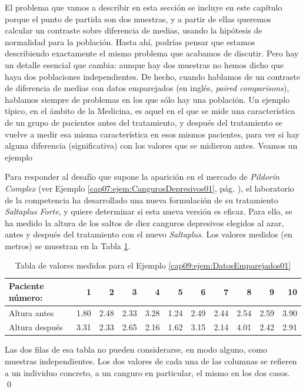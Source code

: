 El problema que vamos a describir en esta sección se incluye en este capítulo porque el punto de partida son dos muestras, y a partir de ellas queremos calcular un contraste sobre diferencia de medias, usando la hipótesis de normalidad para la población. Hasta ahí, podrías pensar que estamos describiendo exactamente el mismo problema que acabamos de discutir. Pero hay un detalle esencial que cambia: aunque hay dos muestras no hemos dicho que haya dos poblaciones independientes. De hecho, cuando hablamos de un contraste de diferencia de medias con {\sf datos emparejados} (en inglés, {\em paired comparisons}), hablamos siempre de problemas en los que sólo hay una población. Un ejemplo típico, en el ámbito de la Medicina, es aquel en el que se mide una característica de un grupo de pacientes antes del tratamiento, y después del tratamiento se vuelve a medir esa misma característica en esos mismos pacientes, para ver si hay alguna diferencia (significativa) con los valores que se midieron antes. Veamos un ejemplo
\begin{ejemplo}
\label{cap09:ejem:DatosEmparejados01}
Para responder al desafío que supone la aparición en el mercado de {\em Pildorín Complex} (ver Ejemplo \ref{cap07:ejem:CangurosDepresivos01}, pág. \pageref{cap07:ejem:CangurosDepresivos01}), el laboratorio de la competencia ha desarrollado una nueva formulación de su tratamiento {\em Saltaplus Forte}, y quiere determinar si esta nueva versión es eficaz. Para ello, se ha medido la altura de los saltos de diez canguros depresivos elegidos al azar, antes y después del tratamiento con el nuevo {\em Saltaplus}. Los valores medidos (en metros) se muestran en la Tabla \ref{cap09:tabla:EjemploContrasteDatosEmparejados01}.

\begin{table}[htb]
{\small
    \begin{center}
    \begin{tabular}{|l|r|r|r|r|r|r|r|r|r|r|}
    \hline
    Paciente número:&1&2& 3 & 4 & 5 & 6 & 7 & 8 & 9 & 10 \\
    \hline
    Altura antes& 1.80 & 2.48 & 2.33 & 3.28 & 1.24 & 2.49 & 2.44 & 2.54 & 2.59 & 3.90\\
    \hline
    Altura después & 3.31 & 2.33 & 2.65 & 2.16 & 1.62 & 3.15 & 2.14 & 4.01 & 2.42 & 2.91  \\
    \hline
    \end{tabular}
    \end{center}
}
\caption{Tabla de valores medidos para el Ejemplo \ref{cap09:ejem:DatosEmparejados01}}
\label{cap09:tabla:EjemploContrasteDatosEmparejados01}
\end{table}
\noindent Las dos filas de esa tabla no pueden considerarse, en modo alguno, como muestras independientes. Los dos valores de cada una de las columnas se refieren a un individuo concreto, a un canguro en particular, el mismo en los dos casos.
\qed
\end{ejemplo}

